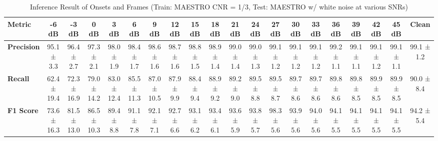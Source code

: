 \documentclass{article}
\begin{document}
\begin{table*}[htbp]
\centering
\caption{Inference Result of Onsets and Frames (Train: MAESTRO CNR = 1/3, Test: MAESTRO w/ white noise at various SNRs)}
\begin{adjustbox}{max width=\textwidth}
\begin{tabular}{@{}lccccccccccccccccccc@{}}
\toprule
\textbf{Metric} & \textbf{-6 dB} & \textbf{-3 dB} & \textbf{0 dB} & \textbf{3 dB} & \textbf{6 dB} & \textbf{9 dB} & \textbf{12 dB} & \textbf{15 dB} & \textbf{18 dB} & \textbf{21 dB} & \textbf{24 dB} & \textbf{27 dB} & \textbf{30 dB} & \textbf{33 dB} & \textbf{36 dB} & \textbf{39 dB} & \textbf{42 dB} & \textbf{45 dB} & \textbf{Clean} \\ 
\midrule
\textbf{Precision} & 95.1 ± 3.3 & 96.4 ± 2.7 & 97.3 ± 2.1 & 98.0 ± 1.9 & 98.4 ± 1.7 & 98.6 ± 1.6 & 98.7 ± 1.6 & 98.8 ± 1.5 & 98.9 ± 1.4 & 99.0 ± 1.4 & 99.0 ± 1.3 & 99.1 ± 1.2 & 99.1 ± 1.2 & 99.1 ± 1.2 & 99.2 ± 1.1 & 99.1 ± 1.1 & 99.1 ± 1.2 & 99.1 ± 1.1 & 99.1 ± 1.2 \\
\textbf{Recall}    & 62.4 ± 19.4 & 72.3 ± 16.9 & 79.0 ± 14.2 & 83.0 ± 12.4 & 85.5 ± 11.3 & 87.0 ± 10.5 & 87.9 ± 9.9 & 88.4 ± 9.4 & 88.9 ± 9.2 & 89.2 ± 9.0 & 89.5 ± 8.8 & 89.5 ± 8.7 & 89.7 ± 8.6 & 89.7 ± 8.6 & 89.8 ± 8.6 & 89.8 ± 8.5 & 89.9 ± 8.5 & 89.9 ± 8.5 & 90.0 ± 8.4 \\
\textbf{F1 Score}  & 73.6 ± 16.3 & 81.5 ± 13.0 & 86.5 ± 10.3 & 89.4 ± 8.8 & 91.1 ± 7.8 & 92.1 ± 7.1 & 92.7 ± 6.6 & 93.1 ± 6.2 & 93.4 ± 6.1 & 93.6 ± 5.9 & 93.8 ± 5.7 & 98.3 ± 5.6 & 93.9 ± 5.6 & 94.0 ± 5.6 & 94.1 ± 5.5 & 94.1 ± 5.5 & 94.1 ± 5.5 & 94.1 ± 5.5 & 94.2 ± 5.4 \\
\bottomrule
\end{tabular}
\end{adjustbox}
\end{table*}
\end{document}
